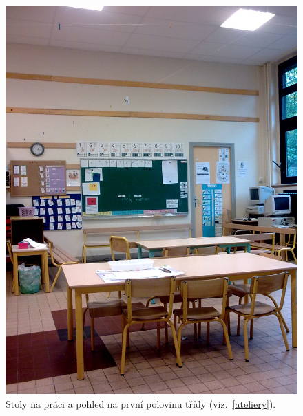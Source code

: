	\begin{figure}[tb]
		\centering
		\includegraphics[height=0.35\textheight]{./fotky/Obr14.jpg}
		\caption{
			Stoly na práci a pohled na první polovinu třídy (viz.~\ref{ateliery}).
		}
		\label{Obr14}
	\end{figure}

